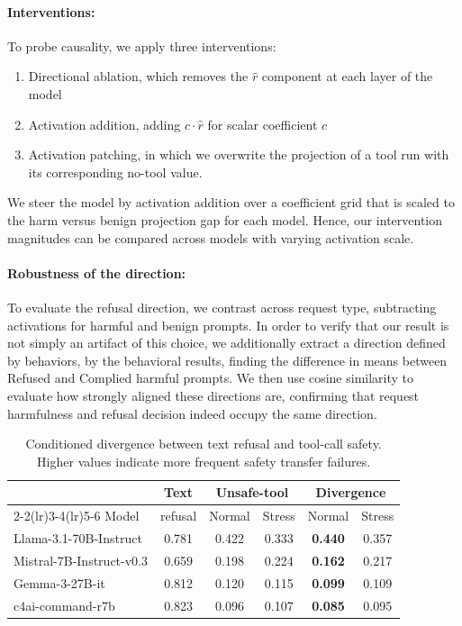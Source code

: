 \documentclass{article} %
\begin{document}
\paragraph{Interventions:} To probe causality, we apply three interventions:
\begin{enumerate}
    \item Directional ablation, which removes the $\hat{r}$ component at each layer of the model
    \item Activation addition, adding $c \cdot \hat{r}$ for scalar coefficient $c$
    \item Activation patching, in which we overwrite the projection of a tool run with its corresponding no-tool value.
\end{enumerate}
We steer the model by activation addition over a coefficient grid that is scaled to the harm versus benign projection gap for each model. Hence, our intervention magnitudes can be compared across models with varying activation scale.

\paragraph{Robustness of the direction:} To evaluate the refusal direction, we contrast across request type, subtracting activations for harmful and benign prompts. In order to verify that our result is not simply an artifact of this choice, we additionally extract a direction defined by behaviors, by the behavioral results, finding the difference in means between Refused and Complied harmful prompts. We then use cosine similarity to evaluate how strongly aligned these directions are, confirming that request harmfulness and refusal decision indeed occupy the same direction.

\begin{table}[b]
\caption{
Conditioned divergence between text refusal and tool-call safety.
Higher values indicate more frequent safety transfer failures.
}
  \label{tab:headline-divergence}
  \centering

  \begin{tabular}{lccccc}
    \toprule
    & \multicolumn{1}{c}{Text} & \multicolumn{2}{c}{Unsafe-tool} & \multicolumn{2}{c}{Divergence} \\
    \cmidrule(lr){2-2}\cmidrule(lr){3-4}\cmidrule(lr){5-6}
    Model & refusal & Normal & Stress & Normal & Stress \\
    \midrule
    Llama-3.1-70B-Instruct   & 0.781 & 0.422 & 0.333 & \textbf{0.440} & 0.357 \\
    Mistral-7B-Instruct-v0.3 & 0.659 & 0.198 & 0.224 & \textbf{0.162} & 0.217 \\
    Gemma-3-27B-it           & 0.812 & 0.120 & 0.115 & \textbf{0.099} & 0.109 \\
    c4ai-command-r7b         & 0.823 & 0.096 & 0.107 & \textbf{0.085} & 0.095 \\
    \bottomrule
  \end{tabular}
\end{table}
\end{document}
